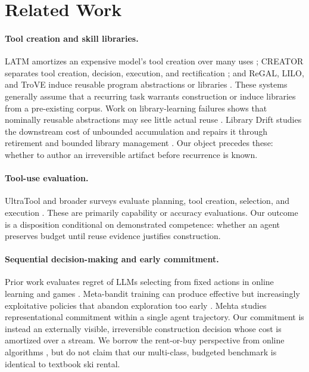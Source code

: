 \documentclass{article}
\begin{document}
\section{Related Work}

\paragraph{Tool creation and skill libraries.}
LATM amortizes an expensive model's tool creation over many uses
\cite{cai2024latm}; CREATOR separates tool creation, decision, execution, and
rectification \cite{qian2023creator}; and ReGAL, LILO, and TroVE induce reusable
program abstractions or libraries \cite{stengeleskin2024regal,grand2024lilo,wang2024trove}.
These systems generally assume that a recurring task warrants construction or
induce libraries from a pre-existing corpus. Work on library-learning failures
shows that nominally reusable abstractions may see little actual reuse
\cite{berlotattwell2024librarylearning}. Library Drift studies the downstream
cost of unbounded accumulation and repairs it through retirement and bounded
library management \cite{zhang2026librarydrift}. Our object precedes these:
whether to author an irreversible artifact before recurrence is known.

\paragraph{Tool-use evaluation.}
UltraTool and broader surveys evaluate planning, tool creation, selection, and
execution \cite{huang2024ultratool,qu2025toollearningsurvey}. These are primarily
capability or accuracy evaluations. Our outcome is a disposition conditional
on demonstrated competence: whether an agent preserves budget until reuse
evidence justifies construction.

\paragraph{Sequential decision-making and early commitment.}
Prior work evaluates regret of LLMs selecting from fixed actions in online
learning and games \cite{park2025regret}. Meta-bandit training can produce
effective but increasingly exploitative policies that abandon exploration too
early \cite{chen2025greedy}. Mehta \cite{mehta2026commit} studies
representational commitment within a single agent trajectory. Our commitment
is instead an externally visible, irreversible construction decision whose
cost is amortized over a stream. We borrow the rent-or-buy perspective from
online algorithms \cite{karlin1994competitive}, but do not claim that our
multi-class, budgeted benchmark is identical to textbook ski rental.
\end{document}
